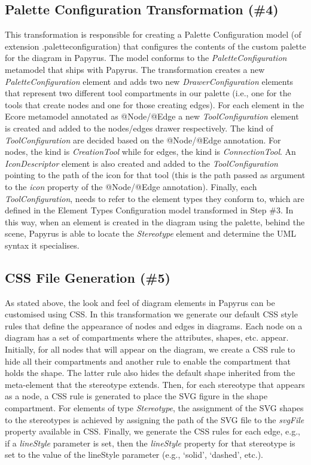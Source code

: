 \subsection{Palette Configuration Transformation (\#4)}
\label{sec:paletteGeneration}
This transformation is responsible for creating a Palette Configuration model (of extension .paletteconfiguration) that configures the contents of the custom palette for the diagram in Papyrus. 
The model conforms to the \textit{PaletteConfiguration} metamodel that ships with Papyrus.
The transformation creates a new \textit{PaletteConfiguration} element and adds two new \textit{DrawerConfiguration} elements that represent two different tool compartments in our palette (i.e., one for the tools that create nodes and one for those creating edges). 
For each element in the Ecore metamodel annotated as @Node/@Edge a new \textit{ToolConfiguration} element is created and added to the nodes/edges drawer respectively. 
The kind of \textit{ToolConfiguration} are decided based on the @Node/@Edge annotation. For nodes, the kind is \textit{CreationTool} while for edges, the kind is \textit{ConnectionTool}.
An \textit{IconDescriptor} element is also created and added to the \textit{ToolConfiguration} pointing to the path of the icon for that tool (this is the path passed as argument to the \textit{icon} property of the @Node/@Edge annotation).
Finally, each \textit{ToolConfiguration}, needs to refer to the element types they conform to, which are defined in the Element Types Configuration model transformed in Step \#3. 
In this way, when an element is created in the diagram using the palette, behind the scene, Papyrus is able to locate the \textit{Stereotype} element and determine the UML syntax it specialises.

\subsection{CSS File Generation (\#5)}
\label{sec:cssGeneration}
As stated above, the look and feel of diagram elements in Papyrus can be customised using CSS. 
In this transformation we generate our default CSS style rules that define the appearance of nodes and edges in diagrams. 
Each node on a diagram has a set of compartments where the attributes, shapes, etc. appear. 
Initially, for all nodes that will appear on the diagram, we create a CSS rule to hide all their compartments and another rule to enable the compartment that holds the shape. 
The latter rule also hides the default shape inherited from the meta-element that the stereotype extends. 
Then, for each stereotype that appears as a node, a CSS rule is generated to place the SVG figure in the shape compartment. 
For elements of type \textit{Stereotype}, the assignment of the SVG shapes to the stereotypes is achieved by assigning the path of the SVG file to the \textit{svgFile} property available in CSS. 
Finally, we generate the CSS rules for each edge, e.g., if a \emph{lineStyle} parameter is set, then the \textit{lineStyle} property for that stereotype is set to the value of the lineStyle parameter (e.g., `solid', `dashed', etc.).

